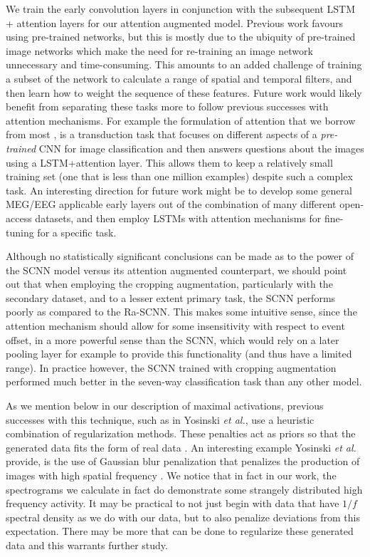 \documentclass[fleqn,10pt]{wlscirep}
\begin{document}
We train the early convolution layers in conjunction with the subsequent LSTM + attention layers for our attention augmented model. Previous work favours using pre-trained networks, but this is mostly due to the ubiquity of pre-trained image networks which make the need for re-training an image network unnecessary and time-consuming. This amounts to an added challenge of training a subset of the network to calculate a range of spatial and temporal filters, and then learn how to weight the sequence of these features. Future work would likely benefit from separating these tasks more to follow previous successes with attention mechanisms. For example the formulation of attention that we borrow from most \cite{Zhu}, is a transduction task that focuses on different aspects of a {\em pre-trained} CNN for image classification and then answers questions about the images using a LSTM+attention layer. This allows them to keep a relatively small training set (one that is less than one million examples) despite such a complex task. An interesting direction for future work might be to develop some general MEG/EEG applicable early layers out of the combination of many different open-access datasets, and then employ LSTMs with attention mechanisms for fine-tuning for a specific task.

Although no statistically significant conclusions can be made as to the power of the SCNN model versus its attention augmented counterpart, we should point out that when employing the cropping augmentation, particularly with the secondary dataset, and to a lesser extent primary task, the SCNN performs poorly as compared to the Ra-SCNN. This makes some intuitive sense, since the attention mechanism should allow for some insensitivity with respect to event offset, in a more powerful sense than the SCNN, which would rely on a later pooling layer for example to provide this functionality (and thus have a limited range). In practice however, the SCNN trained with cropping augmentation performed much better in the seven-way classification task than any other model.

As we mention below in our description of maximal activations, previous successes with this technique, such as in Yosinski {\em et al.}, use a heuristic combination of regularization methods. These penalties act as priors so that the generated data fits the form of real data \cite{Yosinski2015}. An interesting example Yosinski {\em et al.} provide, is the use of Gaussian blur penalization that penalizes the production of images with high spatial frequency \cite{Yosinski2015}. We notice that in fact in our work, the spectrograms we calculate in fact do demonstrate some strangely distributed high frequency activity. It may be practical to not just begin with data that have $1/f$ spectral density as we do with our data, but to also penalize deviations from this expectation. There may be more that can be done to regularize these generated data and this warrants further study.
\end{document}
